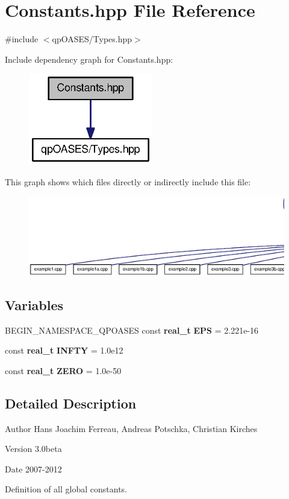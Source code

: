 \section{Constants.hpp File Reference}
\label{Constants_8hpp}
{\ttfamily \#include $<$qpOASES/Types.hpp$>$}\par
Include dependency graph for Constants.hpp:
\nopagebreak
\begin{figure}[H]
\begin{center}
\leavevmode
\includegraphics[width=154pt]{Constants_8hpp__incl}
\end{center}
\end{figure}
This graph shows which files directly or indirectly include this file:
\nopagebreak
\begin{figure}[H]
\begin{center}
\leavevmode
\includegraphics[width=400pt]{Constants_8hpp__dep__incl}
\end{center}
\end{figure}
\subsection*{Variables}
\begin{DoxyCompactItemize}
\item 
BEGIN\_\-NAMESPACE\_\-QPOASES const {\bf real\_\-t} {\bf EPS} = 2.221e-\/16
\item 
const {\bf real\_\-t} {\bf INFTY} = 1.0e12
\item 
const {\bf real\_\-t} {\bf ZERO} = 1.0e-\/50
\end{DoxyCompactItemize}


\subsection{Detailed Description}
\begin{DoxyAuthor}{Author}
Hans Joachim Ferreau, Andreas Potschka, Christian Kirches 
\end{DoxyAuthor}
\begin{DoxyVersion}{Version}
3.0beta 
\end{DoxyVersion}
\begin{DoxyDate}{Date}
2007-\/2012
\end{DoxyDate}
Definition of all global constants. 

